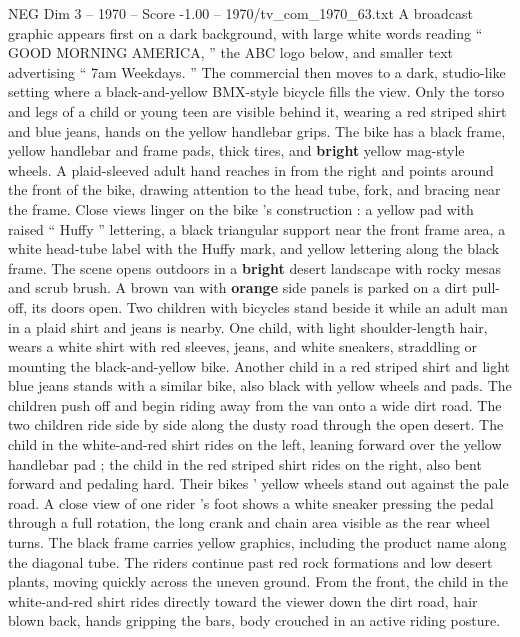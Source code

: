 \begin{textsample}{NEG Dim 3 – 1970 – Score -1.00 – 1970/tv\_com\_1970\_63.txt}  \label{ex:f3_neg_070}
A broadcast graphic appears first on a dark background, with large white words reading “ GOOD MORNING AMERICA, ” the ABC logo below, and smaller text advertising “ 7am Weekdays. ” The commercial then moves to a dark, studio-like setting where a black-and-yellow BMX-style bicycle fills the view.
Only the torso and legs of a child or young teen are visible behind it, wearing a red striped shirt and blue jeans, hands on the yellow handlebar grips.
The bike has a black frame, yellow handlebar and frame pads, thick tires, and \textbf{bright} yellow mag-style wheels.
A plaid-sleeved adult hand reaches in from the right and points around the front of the bike, drawing attention to the head tube, fork, and bracing near the frame.
Close views linger on the bike ’s construction : a yellow pad with raised “ Huffy ” lettering, a black triangular support near the front frame area, a white head-tube label with the Huffy mark, and yellow lettering along the black frame.
The scene opens outdoors in a \textbf{bright} desert landscape with rocky mesas and scrub brush.
A brown van with \textbf{orange} side panels is parked on a dirt pull-off, its doors open.
Two children with bicycles stand beside it while an adult man in a plaid shirt and jeans is nearby.
One child, with light shoulder-length hair, wears a white shirt with red sleeves, jeans, and white sneakers, straddling or mounting the black-and-yellow bike.
Another child in a red striped shirt and light blue jeans stands with a similar bike, also black with yellow wheels and pads.
The children push off and begin riding away from the van onto a wide dirt road.
The two children ride side by side along the dusty road through the open desert.
The child in the white-and-red shirt rides on the left, leaning forward over the yellow handlebar pad ; the child in the red striped shirt rides on the right, also bent forward and pedaling hard.
Their bikes ’ yellow wheels stand out against the pale road.
A close view of one rider ’s foot shows a white sneaker pressing the pedal through a full rotation, the long crank and chain area visible as the rear wheel turns.
The black frame carries yellow graphics, including the product name along the diagonal tube.
The riders continue past red rock formations and low desert plants, moving quickly across the uneven ground.
From the front, the child in the white-and-red shirt rides directly toward the viewer down the dirt road, hair blown back, hands gripping the bars, body crouched in an active riding posture.

\end{textsample}
